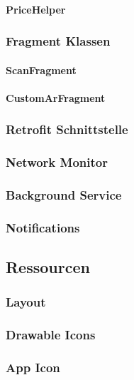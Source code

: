 \documentclass{scrartcl}
\begin{document}
\paragraph{PriceHelper}

\subsubsection{Fragment Klassen}

\paragraph{ScanFragment}

\paragraph{CustomArFragment}

\subsubsection{Retrofit Schnittstelle}

\subsubsection{Network Monitor}

\subsubsection{Background Service}

\subsubsection{Notifications}

\subsection{Ressourcen}

\subsubsection{Layout}

\subsubsection{Drawable Icons}

\subsubsection{App Icon}
\end{document}
